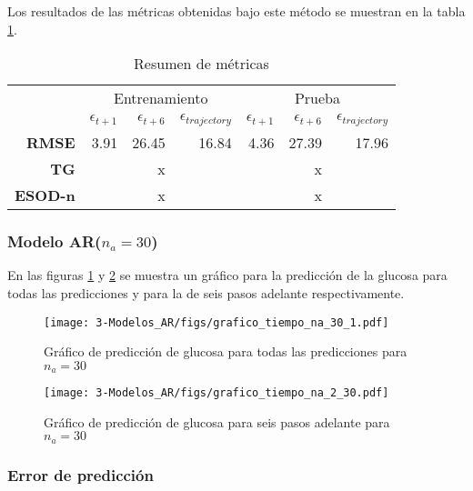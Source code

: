 Los resultados de las métricas obtenidas bajo este método se muestran en la tabla \ref{table:M3_metricas_na2}.

\begin{table}[H]
	\centering
	\begin{tabular}{rrrr|rrr}
		\hline \hline
		& \multicolumn{3}{c|}{Entrenamiento} & \multicolumn{3}{c}{Prueba} \\
		& $\epsilon_{t+1}$ & $\epsilon_{t+6}$ &$\epsilon_{trajectory}$ & $\epsilon_{t+1}$  & $\epsilon_{t+6}$ & $\epsilon_{trajectory}$ \\ \hline
		\textbf{RMSE}   & 3.91 & 26.45 & 16.84 & 4.36 & 27.39 & 17.96 \\
		\textbf{TG}     &      & x     &       &      & x     &       \\
		\textbf{ESOD-n} &      & x     &       &      & x     &       \\ 
		\hline \hline
	\end{tabular}
	\caption{Resumen de métricas}
	\label{table:M3_metricas_na2}
\end{table}







\subsubsection{Modelo AR($n_a=30$)}

En las figuras \ref{fig:M3_tiempo_3} y \ref{fig:M3_tiempo_4} se muestra un gráfico para la predicción de la glucosa para todas las predicciones y para la de seis pasos adelante respectivamente.

\begin{figure}[H]
	\centering
	\texttt{[image: 3-Modelos\_AR/figs/grafico\_tiempo\_na\_30\_1.pdf]}
	\caption{Gráfico de predicción de glucosa para todas las predicciones para $n_a=30$}
	\label{fig:M3_tiempo_3}
\end{figure}

\begin{figure}[H]
	\centering
	\texttt{[image: 3-Modelos\_AR/figs/grafico\_tiempo\_na\_2\_30.pdf]}
	\caption{Gráfico de predicción de glucosa para seis pasos adelante para $n_a=30$}
	\label{fig:M3_tiempo_4}
\end{figure}


\subsubsection*{Error de predicción}

